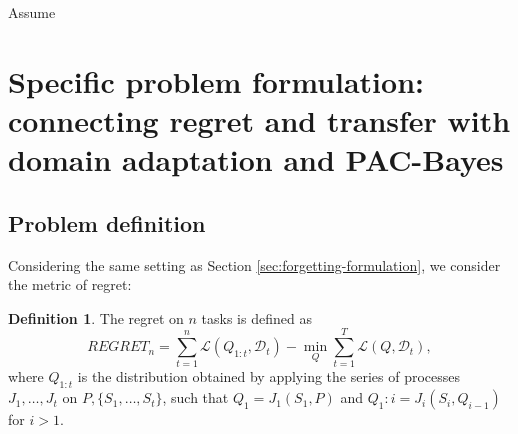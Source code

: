 \documentclass[letterpaper]{article}
\theoremstyle{definition}
\newtheorem{defn}{Definition}[section]
\begin{document}
Assume 




\section{Specific problem formulation: connecting regret and transfer with domain adaptation and PAC-Bayes}

\subsection{Problem definition} \label{sec:regret-formulation}

Considering the same setting as Section \ref{sec:forgetting-formulation}, we consider the metric of regret:

\begin{defn}
	The regret on $n$ tasks is defined as 
	$$REGRET_n = \sum_{t=1}^{n}\mathcal{L}(Q_{1:t}, \mathcal{D}_t)-\min_{Q} \sum_{t=1}^{T}\mathcal{L}(Q, \mathcal{D}_t),$$
	where $Q_{1:t}$ is the distribution obtained by applying the series of processes $J_1, \ldots, J_t$ on $P, \{S_1,\ldots,S_t\}$, such that $Q_1=J_1(S_1,P)$ and $Q_1:i=J_i(S_i, Q_{i-1})$ for $i>1$.
\end{defn}
\end{document}

